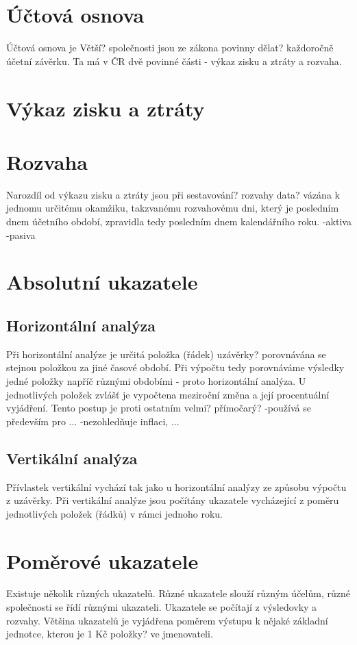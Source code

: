 \section{Účtová osnova}
Účtová osnova je 
Větší? společnosti jsou ze zákona povinny dělat? každoročně účetní závěrku. Ta má v ČR dvě povinné části - výkaz zisku a ztráty a rozvaha. 
\section{Výkaz zisku a ztráty}
\section{Rozvaha}
Narozdíl od výkazu zisku a ztráty jsou při sestavování? rozvahy data? vázána k jednomu určitému okamžiku, takzvanému rozvahovému dni, který je posledním dnem účetního období, zpravidla tedy posledním dnem kalendářního roku.
-aktiva
-pasiva

\section{Absolutní ukazatele}

\subsection{Horizontální analýza}
Při horizontální analýze je určitá položka (řádek) uzávěrky? porovnávána se stejnou položkou za jiné časové období. Při výpočtu tedy porovnáváme výsledky jedné položky napříč různými obdobími - proto horizontální analýza. U jednotlivých položek zvlášť je vypočtena meziroční změna a její procentuální vyjádření. Tento postup je proti ostatním velmi? přímočarý?
-používá se především pro ...
-nezohledňuje inflaci, ...

\subsection{Vertikální analýza}
Přívlastek vertikální vychází tak jako u horizontální analýzy ze způsobu výpočtu z uzávěrky. Při vertikální analýze jsou počítány ukazatele vycházející z poměru jednotlivých položek (řádků) v rámci jednoho roku.

\section{Poměrové ukazatele}
Existuje několik různých ukazatelů. Různé ukazatele slouží různým účelům, různé společnosti se řídí různými ukazateli. Ukazatele se počítají z výsledovky a rozvahy. Většina ukazatelů je vyjádřena poměrem výstupu k nějaké základní jednotce, kterou je 1 Kč položky? ve jmenovateli.


